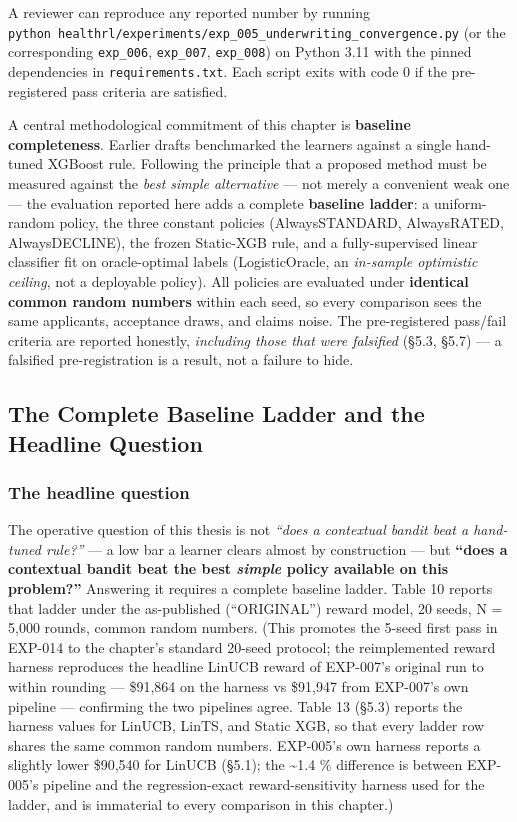 A reviewer can reproduce any reported number by running \texttt{python\ healthrl/experiments/exp\_005\_underwriting\_convergence.py} (or the corresponding \texttt{exp\_006}, \texttt{exp\_007}, \texttt{exp\_008}) on Python 3.11 with the pinned dependencies in \texttt{requirements.txt}. Each script exits with code 0 if the pre-registered pass criteria are satisfied.

A central methodological commitment of this chapter is \textbf{baseline completeness}. Earlier drafts benchmarked the learners against a single hand-tuned XGBoost rule. Following the principle that a proposed method must be measured against the \emph{best simple alternative} --- not merely a convenient weak one --- the evaluation reported here adds a complete \textbf{baseline ladder}: a uniform-random policy, the three constant policies (AlwaysSTANDARD, AlwaysRATED, AlwaysDECLINE), the frozen Static-XGB rule, and a fully-supervised linear classifier fit on oracle-optimal labels (LogisticOracle, an \emph{in-sample optimistic ceiling}, not a deployable policy). All policies are evaluated under \textbf{identical common random numbers} within each seed, so every comparison sees the same applicants, acceptance draws, and claims noise. The pre-registered pass/fail criteria are reported honestly, \emph{including those that were falsified} (§5.3, §5.7) --- a falsified pre-registration is a result, not a failure to hide.

\subsection{The Complete Baseline Ladder and the Headline Question}\label{the-complete-baseline-ladder-and-the-headline-question}

\subsubsection{The headline question}\label{the-headline-question}

The operative question of this thesis is not \emph{``does a contextual bandit beat a hand-tuned rule?''} --- a low bar a learner clears almost by construction --- but \textbf{``does a contextual bandit beat the best \emph{simple} policy available on this problem?''} Answering it requires a complete baseline ladder. Table 10 reports that ladder under the as-published (``ORIGINAL'') reward model, 20 seeds, N = 5,000 rounds, common random numbers. (This promotes the 5-seed first pass in EXP-014 to the chapter's standard 20-seed protocol; the reimplemented reward harness reproduces the headline LinUCB reward of EXP-007's original run to within rounding --- \$91,864 on the harness vs \$91,947 from EXP-007's own pipeline --- confirming the two pipelines agree. Table 13 (§5.3) reports the harness values for LinUCB, LinTS, and Static XGB, so that every ladder row shares the same common random numbers. EXP-005's own harness reports a slightly lower \$90,540 for LinUCB (§5.1); the \textasciitilde1.4 \% difference is between EXP-005's pipeline and the regression-exact reward-sensitivity harness used for the ladder, and is immaterial to every comparison in this chapter.)

